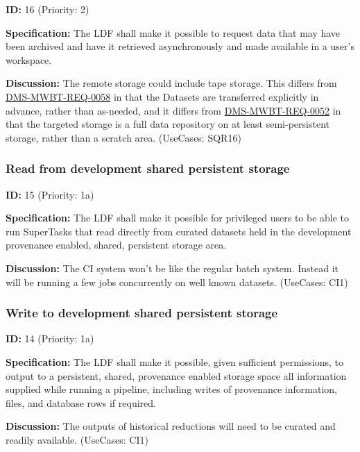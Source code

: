 \documentclass[SE,toc,lsstdraft]{lsstdoc}
\newcommand{\addendum}{}
\begin{document}
\label{16}
\textbf{ID:} 16 (Priority: 2)

\textbf{Specification:}
The LDF shall make it possible to request data that may have been archived and have it retrieved asynchronously and made available in a user's workspace.

\textbf{Discussion:}
The remote storage could include tape storage.  This differs from \hyperref[DMS-MWBT-REQ-0058]{DMS-MWBT-REQ-0058} in that the Datasets are transferred explicitly in advance, rather than as-needed, and it differs from \hyperref[DMS-MWBT-REQ-0052]{DMS-MWBT-REQ-0052} in that the targeted storage is a full data repository on at least semi-persistent storage, rather than a scratch area. (UseCases: SQR16)

\subsubsection{Read from development shared persistent storage}

\label{15}
\textbf{ID:} 15 (Priority: 1a)

\textbf{Specification:}
The LDF shall make it possible for privileged users to be able to run SuperTasks that read directly from curated datasets held in the development provenance enabled, shared, persistent storage area.

\textbf{Discussion:}
The CI system won't be like the regular batch system.  Instead it will be running a few jobs concurrently on well known datasets. (UseCases: CI1)

\subsubsection{Write to development shared persistent storage}

\label{14}
\textbf{ID:} 14 (Priority: 1a)

\textbf{Specification:}
The LDF shall make it possible, given sufficient permissions, to output to a persistent, shared, provenance enabled storage space all information supplied while running a pipeline, including writes of provenance information, files, and database rows if required.

\textbf{Discussion:}
The outputs of historical reductions will need to be curated and readily available. (UseCases: CI1)

\addendum


\end{document}
